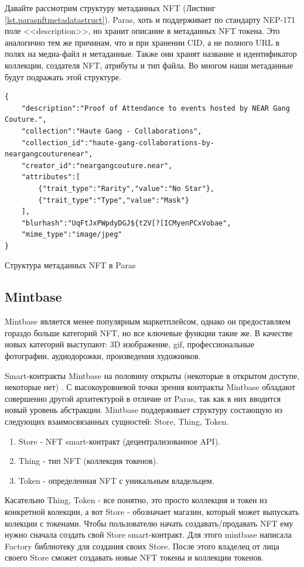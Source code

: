 Давайте рассмотрим структуру метаданных NFT (Листинг {\color{blue}\ref{lst.parasnftmetadatastruct}}). Paras, хоть и поддерживает по стандарту NEP-171 поле <<description>>, но хранит описание в метаданных NFT токена. Это аналогично тем же причинам, что и при хранении CID, а не полного URL в полях на медиа-файл и метаданные. Также они хранят название и идентификатор коллекции, создателя NFT, атрибуты и тип файла. Во многом наши метаданные будут подражать этой структуре.

\begin{listing}
\begin{verbatim}
{
    "description":"Proof of Attendance to events hosted by NEAR Gang Couture.",
    "collection":"Haute Gang - Collaborations",
    "collection_id":"haute-gang-collaborations-by-neargangcouturenear",
    "creator_id":"neargangcouture.near",
    "attributes":[
        {"trait_type":"Rarity","value":"No Star"},
        {"trait_type":"Type","value":"Mask"}
    ],
    "blurhash":"UqFtJxPWpdyDGJ${t2V[?[ICMyenPCxVobae",
    "mime_type":"image/jpeg"
}
\end{verbatim}
\caption{Структура метаданных NFT в Paras}
\label{lst.parasnftmetadatastruct}
\end{listing}


\subsection{Mintbase}

Mintbase является менее популярным маркетплейсом, однако он предоставляем гораздо больше категорий NFT, но все ключевые функции такие же. В качестве новых категорий выступают: 3D изображение, gif, профессиональные фотографии, аудиодорожки, произведения художников.

Smart-контракты Mintbase на половину открыты (некоторые в открытом доступе, некоторые нет) \cite{mintbasecontracts}. С высокоуровневой точки зрения контракты Mintbase обладают совершенно другой архитектурой в отличие от Paras, так как в них вводится новый уровень абстракции.
Mintbase поддерживает структуру состающую из следующих взаимосвязанных сущностей: Store, Thing, Token.
\begin{enumerate}
    \item Store - NFT smart-контракт (децентрализованное API).
    \item Thing - тип NFT (коллекция токенов).
    \item Token - определенная NFT с уникальным владельцем.
\end{enumerate}
Касательно Thing, Token - все понятно, это просто коллекция и токен из конкретной колекции, а вот Store - обозначает магазин, который может выпускать колекции с токенами.
Чтобы пользователю начать создавать/продавать NFT ему нужно сначала создать свой Store smart-контракт. Для этого mintbase написала Factory библиотеку для создания своих Store.
После этого владелец от лица своего Store сможет создавать новые NFT токены и коллекции токенов.

